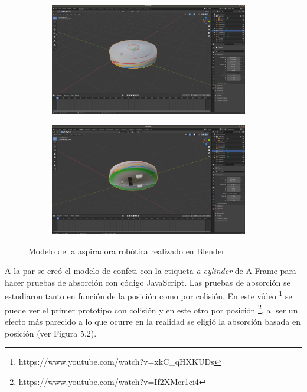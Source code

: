  \begin{figure}[H]
  \begin{subfigure}[b]{0.5\textwidth}
  \centering
    \includegraphics[width=0.95\textwidth, height=0.7\textwidth]{chapters/images/roombablender.png}
    \caption{}
    \label{fig:f1}
  \end{subfigure}
  \hfill
  \begin{subfigure}[b]{0.5\textwidth}
  \centering
    \includegraphics[width=0.95\textwidth, height=0.7\textwidth]{chapters/images/roombablender2.png}
	\caption{}    
    \label{fig:f2}
 
  \end{subfigure}
  \caption{Modelo de la aspiradora robótica  realizado en Blender.}
\end{figure}

A la par se creó el modelo de confeti con la etiqueta \textit{a-cylinder} de A-Frame para hacer pruebas de absorción con código JavaScript.
Las pruebas de absorción se estudiaron tanto en función de la posición como por colisión. En este vídeo \footnote{https://www.youtube.com/watch?v=xkC\_qHXKUDs} se puede ver el primer prototipo con colisión y en este otro  por posición \footnote{https://www.youtube.com/watch?v=If2XMcr1ci4}, al ser un efecto más parecido a lo que ocurre en la realidad se eligió la absorción basada en posición (ver Figura 5.2).

